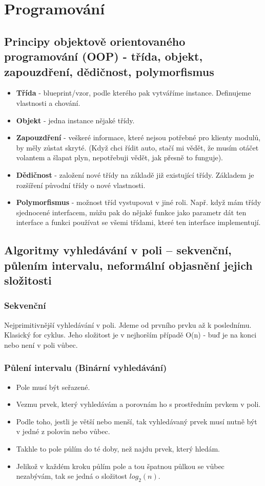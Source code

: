 \documentclass[10pt,a4paper]{article}
\begin{document}
\section{Programování}
\subsection{Principy objektově orientovaného programování (OOP) - třída, objekt, zapouzdření, dědičnost, polymorfismus}

\begin{itemize}
\item \textbf{Třída} - blueprint/vzor, podle kterého pak vytváříme instance. Definujeme vlastnosti a chování.
\item \textbf{Objekt} - jedna instance nějaké třídy.
\item \textbf{Zapouzdření} - veškeré informace, které nejsou potřebné pro klienty modulů, by měly zůstat skryté. (Když chci řídit auto, stačí mi vědět, že musím otáčet volantem a šlapat plyn, nepotřebuji vědět, jak přesně to funguje).
\item \textbf{Dědičnost} - založení nové třídy na základě již existující třídy. Základem je rozšíření původní třídy o nové vlastnosti.
\item \textbf{Polymorfismus} - možnost tříd vystupovat v jiné roli. Např. když mám třídy sjednocené interfacem, můžu pak do nějaké funkce jako parametr dát ten interface a funkci používat se všemi třídami, které ten interface implementují.
\end{itemize}
\subsection{Algoritmy vyhledávání v poli – sekvenční, půlením intervalu, neformální objasnění jejich složitosti}
\subsubsection{Sekvenční}
Nejprimitivnější vyhledávání v poli. Jdeme od prvního prvku až k poslednímu. Klasický for cyklus. Jeho složitost je v nejhorším případě O(n) - buď je na konci nebo není v poli vůbec.
\subsubsection{Půlení intervalu (Binární vyhledávání)}

\begin{itemize}
\item Pole musí být seřazené.
\item Vezmu prvek, který vyhledávám a porovnám ho s prostředním prvkem v poli.
\item Podle toho, jestli je větší nebo menší, tak vyhledávaný prvek musí nutně být v jedné z polovin nebo vůbec.
\item Takhle to pole půlím do té doby, než najdu prvek, který hledám.
\item Jelikož v každém kroku půlím pole a tou špatnou půlkou se vůbec nezabývám, tak se jedná o složitost $log_2(n)$.
\end{itemize}
\end{document}
